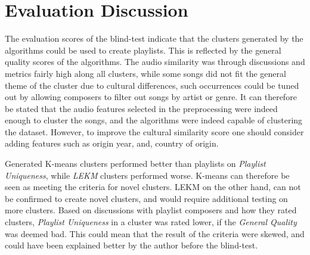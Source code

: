 \documentclass[../report.tex]{subfiles}
\begin{document}


\section{Evaluation Discussion}
The evaluation scores of the blind-test indicate that the clusters generated by the algorithms could be used to create playlists. This is reflected by the general quality scores of the algorithms. The audio similarity was through discussions and metrics fairly high along all clusters, while some songs did not fit the general theme of the cluster due to cultural differences, such occurrences could be tuned out by allowing composers to filter out songs by artist or genre. It can therefore be stated that the audio features selected in the preprocessing were indeed enough to cluster the songs, and the algorithms were indeed capable of clustering the dataset. However, to improve the cultural similarity score one should consider adding features such as origin year, and, country of origin.

Generated K-means clusters performed better than playlists on \textit{Playlist Uniqueness}, while \textit{LEKM} clusters performed worse. K-means can therefore be seen as meeting the criteria for novel clusters. LEKM on the other hand, can not be confirmed to create novel clusters, and would require additional testing on more clusters. Based on discussions with playlist composers and how they rated clusters, \textit{Playlist Uniqueness} in a cluster was rated lower, if the \textit{General Quality} was deemed bad. This could mean that the result of the criteria were skewed, and could have been explained better by the author before the blind-test.
\end{document}
